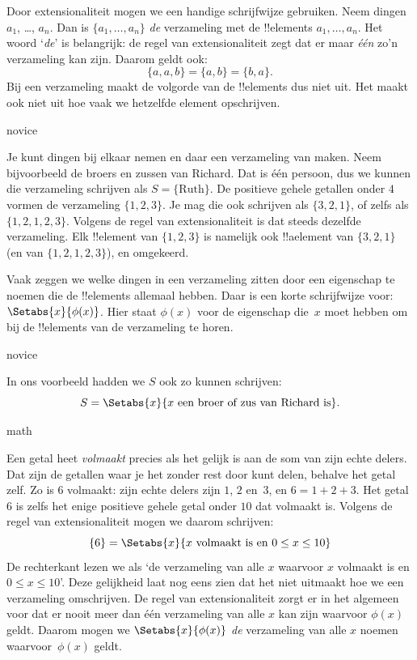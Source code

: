 \documentclass[openany]{memoir}
\begin{document}
Door extensionaliteit mogen we een handige schrijfwijze gebruiken.
Neem dingen $a_{1}$, \dots, $a_{n}$. Dan is
$\{a_{1}, \dots, a_{n}\}$ \emph{de} verzameling met de !!{element}s
$a_1, \ldots, a_n$. Het woord ‘\emph{de}’ is belangrijk: de regel van
extensionaliteit zegt dat er maar \emph{één} zo'n verzameling kan
zijn. Daarom geldt ook:
  \[
    \{a, a, b\} = \{a, b\} = \{b,a\}.
  \] 
Bij een verzameling maakt de volgorde van de !!{element}s dus niet
uit. Het maakt ook niet uit hoe vaak we hetzelfde element opschrijven.

\begin{tagblock}{novice}
\begin{ex}
Je kunt dingen bij elkaar nemen en daar een verzameling van maken.
Neem bijvoorbeeld de broers en zussen van Richard. Dat is één
persoon, dus we kunnen die verzameling schrijven als
$S=\{\textrm{Ruth}\}$. De positieve gehele getallen onder $4$ vormen
de verzameling $\{1, 2, 3\}$. Je mag die ook schrijven als
$\{3, 2, 1\}$, of zelfs als $\{1, 2, 1, 2, 3\}$. Volgens de regel van
extensionaliteit is dat steeds dezelfde verzameling. Elk !!{element}
van $\{1, 2, 3\}$ is namelijk ook !!a{element} van $\{3, 2, 1\}$ (en
van $\{1, 2, 1, 2, 3\}$), en omgekeerd.
\end{ex} 
\end{tagblock}

Vaak zeggen we welke dingen in een verzameling zitten door een
eigenschap te noemen die de !!{element}s allemaal hebben. Daar is een korte
schrijfwijze voor: $\Setabs{x}{\phi(x)}$. Hier staat $\phi(x)$ voor
de eigenschap die~$x$ moet hebben om bij de !!{element}s van de
verzameling te horen.

\begin{tagblock}{novice}
\begin{ex}
In ons voorbeeld hadden we $S$ ook zo kunnen schrijven:
\[
S = \Setabs{x}{x \text{ een broer of zus van Richard is}}.
\]
\end{ex}
\end{tagblock}

\begin{tagblock}{math}
\begin{ex}
Een getal heet \emph{volmaakt} precies als het gelijk is aan de som
van zijn echte delers. Dat zijn de getallen waar je het zonder rest door
kunt delen, behalve het getal zelf. Zo is $6$ volmaakt: zijn echte
delers zijn $1$, $2$ en~$3$, en $6 = 1 + 2 + 3$. Het getal $6$ is
zelfs het enige positieve gehele getal onder $10$ dat volmaakt is.
Volgens de regel van extensionaliteit mogen we daarom schrijven:
\[
	\{6\} = \Setabs{x}{x\text{ volmaakt is en }0 \leq x \leq 10}
\]
De rechterkant lezen we als ‘de verzameling van alle $x$ waarvoor $x$
volmaakt is en $0 \leq x \leq 10$’. Deze gelijkheid laat nog eens zien
dat het niet uitmaakt hoe we een verzameling omschrijven. De regel van
extensionaliteit zorgt er in het algemeen voor dat er nooit meer dan één
verzameling van alle $x$ kan zijn waarvoor $\phi(x)$ geldt. Daarom
mogen we $\Setabs{x}{\phi(x)}$ \emph{de} verzameling van alle $x$
noemen waarvoor~$\phi(x)$ geldt.
\end{ex}
\end{tagblock}
\end{document}

